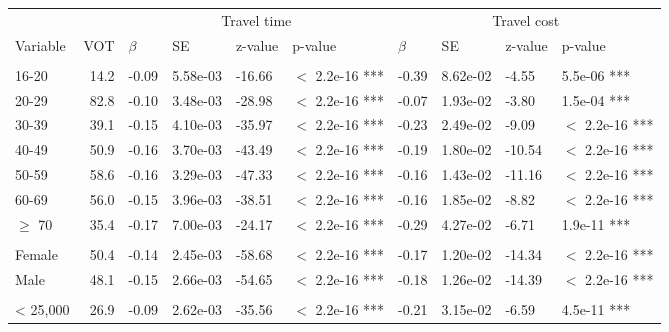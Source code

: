 \documentclass{article}\usepackage[utf8]{inputenc}
\begin{document}
\begin{table}[H]
\begin{tabular}{lrllllllll}
\toprule
\multicolumn{2}{c}{ } & \multicolumn{4}{c}{Travel time} & \multicolumn{4}{c}{Travel cost} \\
\cmidrule(l{3pt}r{3pt}){3-6} \cmidrule(l{3pt}r{3pt}){7-10}
Variable & VOT & $\beta$ & SE & z-value & p-value & $\beta$ & SE & z-value & p-value\\
\midrule
\addlinespace[0.3em]
\multicolumn{10}{l}{\textbf{Age model, $McFadden~R^2 = 0.54$}}\\
\hline
\hspace{1em}16-20 & 14.2 & -0.09 & 5.58e-03 & -16.66 & $<$ 2.2e-16 *** & -0.39 & 8.62e-02 & -4.55 & 5.5e-06 ***\\
\hspace{1em}20-29 & 82.8 & -0.10 & 3.48e-03 & -28.98 & $<$ 2.2e-16 *** & -0.07 & 1.93e-02 & -3.80 & 1.5e-04 ***\\
\hspace{1em}30-39 & 39.1 & -0.15 & 4.10e-03 & -35.97 & $<$ 2.2e-16 *** & -0.23 & 2.49e-02 & -9.09 & $<$ 2.2e-16 ***\\
\hspace{1em}40-49 & 50.9 & -0.16 & 3.70e-03 & -43.49 & $<$ 2.2e-16 *** & -0.19 & 1.80e-02 & -10.54 & $<$ 2.2e-16 ***\\
\hspace{1em}50-59 & 58.6 & -0.16 & 3.29e-03 & -47.33 & $<$ 2.2e-16 *** & -0.16 & 1.43e-02 & -11.16 & $<$ 2.2e-16 ***\\
\hspace{1em}60-69 & 56.0 & -0.15 & 3.96e-03 & -38.51 & $<$ 2.2e-16 *** & -0.16 & 1.85e-02 & -8.82 & $<$ 2.2e-16 ***\\
\hspace{1em}$\geq$ 70 & 35.4 & -0.17 & 7.00e-03 & -24.17 & $<$ 2.2e-16 *** & -0.29 & 4.27e-02 & -6.71 & 1.9e-11 ***\\
\addlinespace[0.3em]
\multicolumn{10}{l}{\textbf{Gender, $McFadden~R^2 = 0.53$}}\\
\hline
\hspace{1em}Female & 50.4 & -0.14 & 2.45e-03 & -58.68 & $<$ 2.2e-16 *** & -0.17 & 1.20e-02 & -14.34 & $<$ 2.2e-16 ***\\
\hspace{1em}Male & 48.1 & -0.15 & 2.66e-03 & -54.65 & $<$ 2.2e-16 *** & -0.18 & 1.26e-02 & -14.39 & $<$ 2.2e-16 ***\\
\addlinespace[0.3em]
\multicolumn{10}{l}{\textbf{Income model, $McFadden~R^2 = 0.55$}}\\
\hline
\hspace{1em}< 25,000 & 26.9 & -0.09 & 2.62e-03 & -35.56 & $<$ 2.2e-16 *** & -0.21 & 3.15e-02 & -6.59 & 4.5e-11 ***\\

\end{tabular}
\end{table}
\end{document}
